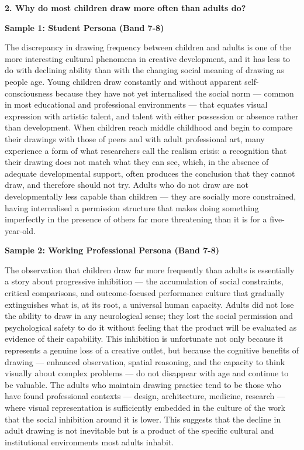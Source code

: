 \separator

\begin{ieltsquestion}
\textbf{2. Why do most children draw more often than adults do?}
\end{ieltsquestion}
\textbf{Sample 1: Student Persona (Band 7-8)}

The discrepancy in drawing frequency between children and adults is one of the more interesting cultural phenomena in creative development, and it has less to do with declining ability than with the changing social meaning of drawing as people age. Young children draw constantly and without apparent self-consciousness because they have not yet internalised the social norm — common in most educational and professional environments — that equates visual expression with artistic talent, and talent with either possession or absence rather than development. When children reach middle childhood and begin to compare their drawings with those of peers and with adult professional art, many experience a form of what researchers call the realism crisis: a recognition that their drawing does not match what they can see, which, in the absence of adequate developmental support, often produces the conclusion that they cannot draw, and therefore should not try. Adults who do not draw are not developmentally less capable than children — they are socially more constrained, having internalised a permission structure that makes doing something imperfectly in the presence of others far more threatening than it is for a five-year-old.

\textbf{Sample 2: Working Professional Persona (Band 7-8)}

The observation that children draw far more frequently than adults is essentially a story about progressive inhibition — the accumulation of social constraints, critical comparisons, and outcome-focused performance culture that gradually extinguishes what is, at its root, a universal human capacity. Adults did not lose the ability to draw in any neurological sense; they lost the social permission and psychological safety to do it without feeling that the product will be evaluated as evidence of their capability. This inhibition is unfortunate not only because it represents a genuine loss of a creative outlet, but because the cognitive benefits of drawing — enhanced observation, spatial reasoning, and the capacity to think visually about complex problems — do not disappear with age and continue to be valuable. The adults who maintain drawing practice tend to be those who have found professional contexts — design, architecture, medicine, research — where visual representation is sufficiently embedded in the culture of the work that the social inhibition around it is lower. This suggests that the decline in adult drawing is not inevitable but is a product of the specific cultural and institutional environments most adults inhabit.

